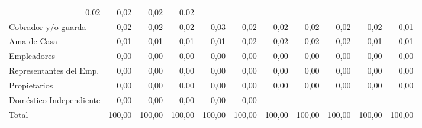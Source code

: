 \begin{tabular}{lllllllllll}
  \multicolumn{1}{r}{0,02} &
  \multicolumn{1}{r}{0,02} &
  \multicolumn{1}{r}{0,02} &
  \multicolumn{1}{r}{0,02} \\
\multicolumn{1}{l}{\hspace{1em}Cobrador y/o guarda} &
  \multicolumn{1}{|r}{0,02} &
  \multicolumn{1}{r}{0,02} &
  \multicolumn{1}{r}{0,02} &
  \multicolumn{1}{r}{0,03} &
  \multicolumn{1}{r}{0,02} &
  \multicolumn{1}{r}{0,02} &
  \multicolumn{1}{r}{0,02} &
  \multicolumn{1}{r}{0,02} &
  \multicolumn{1}{r}{0,02} &
  \multicolumn{1}{r}{0,01} \\
\multicolumn{1}{l}{\hspace{1em}Ama de Casa} &
  \multicolumn{1}{|r}{0,01} &
  \multicolumn{1}{r}{0,01} &
  \multicolumn{1}{r}{0,01} &
  \multicolumn{1}{r}{0,01} &
  \multicolumn{1}{r}{0,02} &
  \multicolumn{1}{r}{0,02} &
  \multicolumn{1}{r}{0,02} &
  \multicolumn{1}{r}{0,02} &
  \multicolumn{1}{r}{0,01} &
  \multicolumn{1}{r}{0,01} \\
\multicolumn{1}{l}{\hspace{1em}Empleadores} &
  \multicolumn{1}{|r}{0,00} &
  \multicolumn{1}{r}{0,00} &
  \multicolumn{1}{r}{0,00} &
  \multicolumn{1}{r}{0,00} &
  \multicolumn{1}{r}{0,00} &
  \multicolumn{1}{r}{0,00} &
  \multicolumn{1}{r}{0,00} &
  \multicolumn{1}{r}{0,00} &
  \multicolumn{1}{r}{0,00} &
  \multicolumn{1}{r}{0,00} \\
\multicolumn{1}{l}{\hspace{1em}Representantes del Emp.} &
  \multicolumn{1}{|r}{0,00} &
  \multicolumn{1}{r}{0,00} &
  \multicolumn{1}{r}{0,00} &
  \multicolumn{1}{r}{0,00} &
  \multicolumn{1}{r}{0,00} &
  \multicolumn{1}{r}{0,00} &
  \multicolumn{1}{r}{0,00} &
  \multicolumn{1}{r}{0,00} &
  \multicolumn{1}{r}{0,00} &
  \multicolumn{1}{r}{0,00} \\
\multicolumn{1}{l}{\hspace{1em}Propietarios} &
  \multicolumn{1}{|r}{0,00} &
  \multicolumn{1}{r}{0,00} &
  \multicolumn{1}{r}{0,00} &
  \multicolumn{1}{r}{0,00} &
  \multicolumn{1}{r}{0,00} &
  \multicolumn{1}{r}{0,00} &
  \multicolumn{1}{r}{0,00} &
  \multicolumn{1}{r}{0,00} &
  \multicolumn{1}{r}{0,00} &
  \multicolumn{1}{r}{0,00} \\
\multicolumn{1}{l}{\hspace{1em}Doméstico Independiente} &
  \multicolumn{1}{|r}{0,00} &
  \multicolumn{1}{r}{0,00} &
  \multicolumn{1}{r}{0,00} &
  \multicolumn{1}{r}{0,00} &
  \multicolumn{1}{r}{0,00} &
  \multicolumn{1}{r}{} &
  \multicolumn{1}{r}{} &
  \multicolumn{1}{r}{} &
  \multicolumn{1}{r}{} &
  \multicolumn{1}{r}{} \\
\multicolumn{1}{l}{\hspace{1em}Total} &
  \multicolumn{1}{|r}{100,00} &
  \multicolumn{1}{r}{100,00} &
  \multicolumn{1}{r}{100,00} &
  \multicolumn{1}{r}{100,00} &
  \multicolumn{1}{r}{100,00} &
  \multicolumn{1}{r}{100,00} &
  \multicolumn{1}{r}{100,00} &
  \multicolumn{1}{r}{100,00} &
  \multicolumn{1}{r}{100,00} &
  \multicolumn{1}{r}{100,00} \\
\cline{1-11}
\end{tabular}
